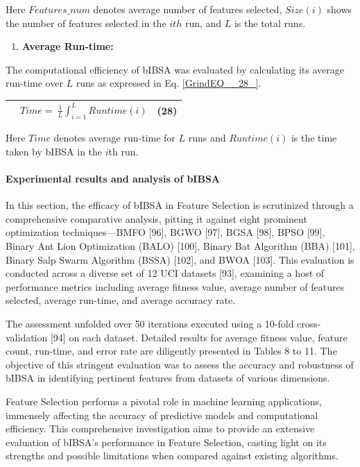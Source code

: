\documentclass{article} %
\begin{document}
Here $Features\_num$ denotes average number of features selected, $Size\left(i\right)$ shows the number of features selected in the $ith$  run, and $L$ is the total runs.

\begin{enumerate}
\item  \textbf{Average Run-time:}
\end{enumerate}

The computational efficiency of bIBSA was evaluated by calculating its average run-time over $L$ runs as expressed in Eq. \eqref{GrindEQ__28_}.

\begin{tabular}{|p{0.4in}|p{2.9in}|p{0.5in}|} \hline 
 & $Time=\ \frac{1}{L}\int^L_{i=1}{Runtime\left(i\right)}$ & (28) \\ \hline 
\end{tabular}

Here $Time$ denotes average run-time for $L$  runs and $Runtime\left(i\right)$ is the time taken by bIBSA in the $i$th run.


\paragraph{ Experimental results and analysis of bIBSA}

In this section, the efficacy of bIBSA in Feature Selection is scrutinized through a comprehensive comparative analysis, pitting it against eight prominent optimization techniques---BMFO [96], BGWO [97], BGSA [98], BPSO [99], Binary Ant Lion Optimization (BALO) [100], Binary Bat Algorithm (BBA) [101], Binary Salp Swarm Algorithm (BSSA) [102], and BWOA [103]. This evaluation is conducted across a diverse set of 12 UCI datasets [93], examining a host of performance metrics including average fitness value, average number of features selected, average run-time, and average accuracy rate.

The assessment unfolded over 50 iterations executed using a 10-fold cross-validation [94] on each dataset. Detailed results for average fitness value, feature count, run-time, and error rate are diligently presented in Tables 8 to 11. The objective of this stringent evaluation was to assess the accuracy and robustness of bIBSA in identifying pertinent features from datasets of various dimensions.

Feature Selection performs a pivotal role in machine learning applications, immensely affecting the accuracy of predictive models and computational efficiency. This comprehensive investigation aims to provide an extensive evaluation of bIBSA's performance in Feature Selection, casting light on its strengths and possible limitations when compared against existing algorithms.
\end{document}
